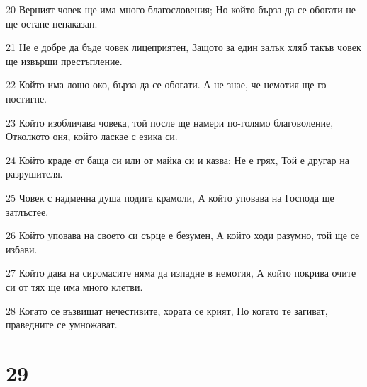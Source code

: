 \par 20 Верният човек ще има много благословения; Но който бърза да се обогати не ще остане ненаказан.
\par 21 Не е добре да бъде човек лицеприятен, Защото за един залък хляб такъв човек ще извърши престъпление.
\par 22 Който има лошо око, бърза да се обогати. А не знае, че немотия ще го постигне.
\par 23 Който изобличава човека, той после ще намери по-голямо благоволение, Отколкото оня, който ласкае с езика си.
\par 24 Който краде от баща си или от майка си и казва: Не е грях, Той е другар на разрушителя.
\par 25 Човек с надменна душа подига крамоли, А който уповава на Господа ще затлъстее.
\par 26 Който уповава на своето си сърце е безумен, А който ходи разумно, той ще се избави.
\par 27 Който дава на сиромасите няма да изпадне в немотия, А който покрива очите си от тях ще има много клетви.
\par 28 Когато се възвишат нечестивите, хората се крият, Но когато те загиват, праведните се умножават.

\chapter{29}

